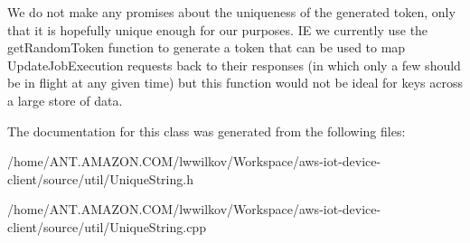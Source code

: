 We do not make any promises about the uniqueness of the generated token, only that it is hopefully unique enough for our purposes. IE we currently use the get\+Random\+Token function to generate a token that can be used to map Update\+Job\+Execution requests back to their responses (in which only a few should be in flight at any given time) but this function would not be ideal for keys across a large store of data. 

The documentation for this class was generated from the following files\+:\begin{DoxyCompactItemize}
\item 
/home/\+A\+N\+T.\+A\+M\+A\+Z\+O\+N.\+C\+O\+M/lwwilkov/\+Workspace/aws-\/iot-\/device-\/client/source/util/Unique\+String.\+h\item 
/home/\+A\+N\+T.\+A\+M\+A\+Z\+O\+N.\+C\+O\+M/lwwilkov/\+Workspace/aws-\/iot-\/device-\/client/source/util/Unique\+String.\+cpp\end{DoxyCompactItemize}
